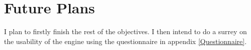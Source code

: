 \section{Future Plans} %
\label{sec:future_plans}

I plan to firstly finish the rest of the objectives. I then intend to do a surrey on the usability of the engine using the questionnaire in appendix  \ref{Questionnaire}.


